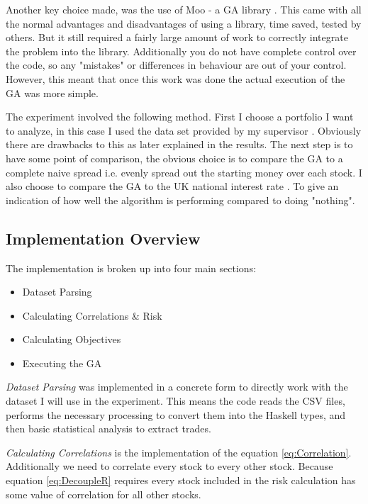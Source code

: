 \documentclass[11pt]{article}
\begin{document}
    Another key choice made, was the use of Moo - a GA library \cite{Moo}. This came with all
    the normal advantages and disadvantages of using a library, time saved, tested by others.
    But it still required a fairly large amount of work to correctly integrate the
    problem into the library. Additionally you do not have complete control over the code,
    so any "mistakes" or differences in behaviour are out of your control. However,
    this meant that once this work was done the actual execution of the GA was more simple.

    The experiment involved the following method. First I choose a portfolio I want to
    analyze, in this case I used the data set provided by my supervisor \cite{Dataset}.
    Obviously there are drawbacks to this as later explained in the results. The next step is
    to have some point of comparison, the obvious choice is to compare the GA to
    a complete naive spread i.e. evenly spread out the starting money over each stock.
    I also choose to compare the GA to the UK national interest rate \cite{BankOfE} . To give an
    indication of how well the algorithm is performing compared to doing "nothing".

\subsection{Implementation Overview}

    The implementation is broken up into four main sections:

    \begin{itemize}
        \item{Dataset Parsing}
        \item{Calculating Correlations \& Risk}
        \item{Calculating Objectives}
        \item{Executing the GA}
    \end{itemize}

    \textit{Dataset Parsing} was implemented in a concrete form to directly work with the
    dataset I will use in the experiment. This means the code reads the CSV files,
    performs the necessary processing to convert them into the Haskell types, and then
    basic statistical analysis to extract trades.

    \textit{Calculating Correlations} is the implementation of the equation \ref{eq:Correlation}.
    Additionally we need to correlate every stock to every other stock. Because equation
    \ref{eq:DecoupleR} requires every stock included in the risk calculation has some value of
    correlation for all other stocks.
\end{document}
